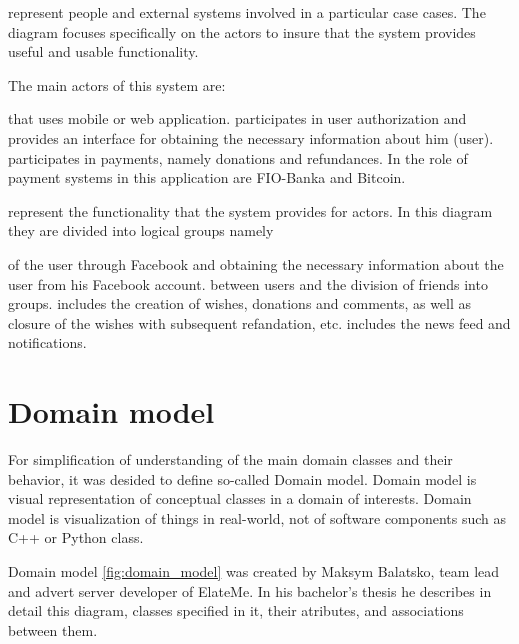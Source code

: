 \begin{itemize}
 represent people and external systems involved in a particular case cases. The diagram focuses
specifically on the actors to insure that the system provides useful and usable functionality.

The main actors of this system are:
\begin{itemize}
 that uses mobile or web application.
 participates in user authorization and provides an interface for obtaining the necessary information
about him (user).
 participates in payments, namely donations and refundances. In the role of payment systems in
this application are FIO-Banka and Bitcoin.
\end{itemize}

 represent the functionality that the system provides for actors. In this diagram they are
divided into logical groups namely
\begin{itemize}
 of the user through Facebook and obtaining the necessary information about the user from his
Facebook account.
 between users and the division of friends into groups.
 includes the creation of wishes, donations and comments, as well as closure of the wishes with
subsequent refandation, etc.
 includes the news feed and notifications.
\end{itemize}

\end{itemize}


\section{Domain model}
For simplification of understanding of the main domain classes and their behavior, it was desided to define so-called
Domain model. Domain model is visual representation of conceptual classes in a domain of interests. Domain model is
visualization of things in real-world, not of software components such as C++ or Python class.\cite{domainmodel}

Domain model \ref{fig:domain_model} was created by Maksym Balatsko, team lead and advert server developer of ElateMe. In
his bachelor's thesis\cite{adserver} he describes in detail this diagram, classes specified in it, their atributes, and
associations between them.

